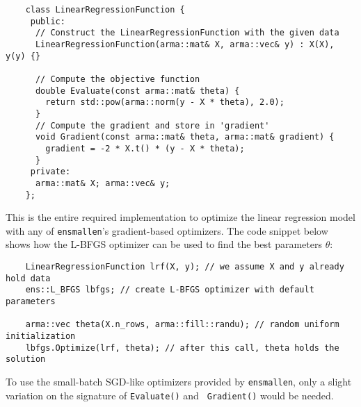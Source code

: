 \documentclass{article}
\begin{document}
\vspace*{-0.4em}
\begin{verbatim}
    class LinearRegressionFunction {
     public:
      // Construct the LinearRegressionFunction with the given data
      LinearRegressionFunction(arma::mat& X, arma::vec& y) : X(X), y(y) {}

      // Compute the objective function
      double Evaluate(const arma::mat& theta) {
        return std::pow(arma::norm(y - X * theta), 2.0);
      }
      // Compute the gradient and store in 'gradient'
      void Gradient(const arma::mat& theta, arma::mat& gradient) {
        gradient = -2 * X.t() * (y - X * theta);
      }
     private:
      arma::mat& X; arma::vec& y;
    };
\end{verbatim}
\vspace*{-0.4em}

This is the entire required implementation to optimize the linear regression model with
any of {\tt ensmallen}'s gradient-based optimizers.  The code snippet below
shows how the L-BFGS optimizer can be used to find the best parameters $\theta$:

\vspace*{-0.4em}
\begin{verbatim}
    LinearRegressionFunction lrf(X, y); // we assume X and y already hold data
    ens::L_BFGS lbfgs; // create L-BFGS optimizer with default parameters

    arma::vec theta(X.n_rows, arma::fill::randu); // random uniform initialization
    lbfgs.Optimize(lrf, theta); // after this call, theta holds the solution
\end{verbatim}
\vspace*{-0.4em}

To use the small-batch SGD-like optimizers provided by {\tt ensmallen},
only a slight variation on the signature of {\tt Evaluate()} and {\tt
Gradient()} would be needed.

\vspace*{-0.3em}
\end{document}
